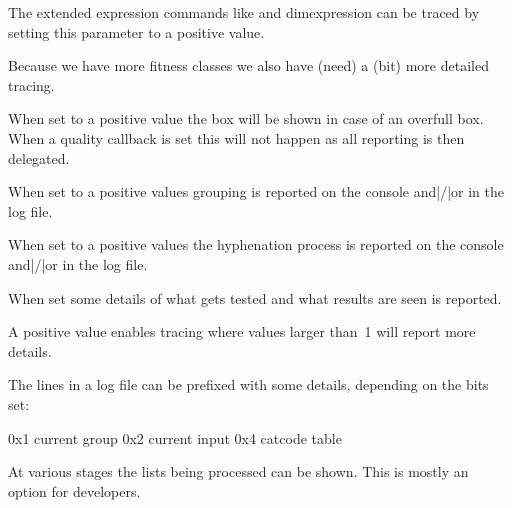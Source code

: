 The extended expression commands like  and \prm
{dimexpression} can be traced by setting this parameter to a positive value.

\stopnewprimitive

\startnewprimitive[title={\prm {tracingfitness}}]

Because we have more fitness classes we also have (need) a (bit) more detailed
tracing.

\stopnewprimitive

\startnewprimitive[title={\prm {tracingfullboxes}}]

When set to a positive value the box will be shown in case of an overfull box.
When a quality callback is set this will not happen as all reporting is then
delegated.

\stopnewprimitive

\startoldprimitive[title={\prm {tracinggroups}}]

When set to a positive values grouping is reported on the console and|/|or in the
log file.

\stopoldprimitive

\startnewprimitive[title={\prm {tracinghyphenation}}]

When set to a positive values the hyphenation process is reported on the console
and|/|or in the log file.

\stopnewprimitive

\startoldprimitive[title={\prm {tracingifs}}]

When set some details of what gets tested and what results are seen is reported.

\stopoldprimitive

\startnewprimitive[title={\prm {tracinginserts}}]

A positive value enables tracing where values larger than~1 will report more
details.

\stopnewprimitive

\startnewprimitive[title={\prm {tracinglevels}}]

The lines in a log file can be prefixed with some details, depending on the bits
set:

\starttabulate[|T|l|]
\NC 0x1 \NC current group \NC \NR
\NC 0x2 \NC current input \NC \NR
\NC 0x4 \NC catcode table \NC \NR
\stoptabulate

\stopnewprimitive

\startnewprimitive[title={\prm {tracinglists}}]

At various stages the lists being processed can be shown. This is mostly an
option for developers.

